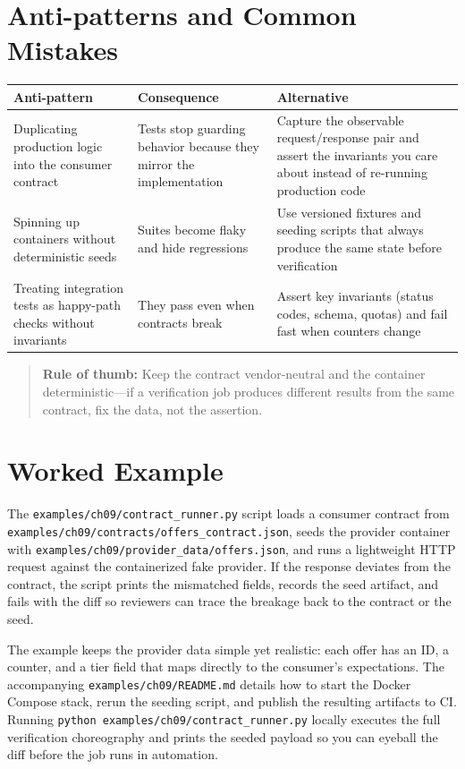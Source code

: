 \section{Anti-patterns and Common Mistakes}
\begin{tabular}{p{4cm}p{4cm}p{4cm}}
\toprule
Anti-pattern & Consequence & Alternative \\
\midrule
Duplicating production logic into the consumer contract & Tests stop guarding behavior because they mirror the implementation & Capture the observable request/response pair and assert the invariants you care about instead of re-running production code \\
Spinning up containers without deterministic seeds & Suites become flaky and hide regressions & Use versioned fixtures and seeding scripts that always produce the same state before verification \\
Treating integration tests as happy-path checks without invariants & They pass even when contracts break & Assert key invariants (status codes, schema, quotas) and fail fast when counters change \\
\bottomrule
\end{tabular}

\begin{quote}
\textbf{Rule of thumb:} Keep the contract vendor-neutral and the container deterministic—if a verification job produces different results from the same contract, fix the data, not the assertion.
\end{quote}

\section{Worked Example}
The \texttt{examples/ch09/contract\_runner.py} script loads a consumer contract from \texttt{examples/ch09/contracts/offers\_contract.json}, seeds the provider container with \texttt{examples/ch09/provider\_data/offers.json}, and runs a lightweight HTTP request against the containerized fake provider. If the response deviates from the contract, the script prints the mismatched fields, records the seed artifact, and fails with the diff so reviewers can trace the breakage back to the contract or the seed.

The example keeps the provider data simple yet realistic: each offer has an ID, a counter, and a tier field that maps directly to the consumer's expectations. The accompanying \texttt{examples/ch09/README.md} details how to start the Docker Compose stack, rerun the seeding script, and publish the resulting artifacts to CI. Running \texttt{python examples/ch09/contract\_runner.py} locally executes the full verification choreography and prints the seeded payload so you can eyeball the diff before the job runs in automation.

